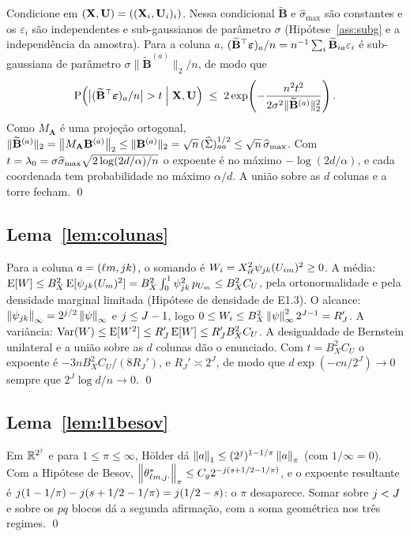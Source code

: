 \documentclass[11pt,a4paper]{article}
\newcommand{\Amat}{\mathbf{A}}
\newcommand{\Bmat}{\mathbf{B}}
\newcommand{\Btil}{\widetilde{\Bmat}}
\newcommand{\MA}{M_{\Amat}}
\newcommand{\bveps}{\boldsymbol{\varepsilon}}
\newcommand{\smax}{\widehat{\sigma}_{\max}}
\begin{document}
Condicione em $(\mathbf{X},\mathbf{U}) = ((\mathbf{X}_{i},\mathbf{U}_{i})_{i})$. Nessa condicional $\Btil$
e $\smax$ são constantes e os $\varepsilon_{i}$ são independentes e
sub-gaussianos de parâmetro $\sigma$ (Hipótese~\ref{ass:subg} e a
independência da amostra). Para a coluna $a$,
$(\Btil\T\bveps)_{a}/n = n^{-1}\sum_{i}\Btil_{ia}\varepsilon_{i}$ é
sub-gaussiana de parâmetro $\sigma\lVert\Btil^{(a)}\rVert_{2}/n$, de modo que
\[
  \Prob\Bigl(\bigl|(\Btil\T\bveps)_{a}/n\bigr| > t \;\Big|\; \bX,\bU\Bigr)
  \;\le\; 2\exp\!\left(-\frac{n^{2}t^{2}}{2\sigma^{2}\lVert\Btil^{(a)}\rVert_{2}^{2}}\right).
\]
Como $\MA$ é uma projeção ortogonal, $\lVert\Btil^{(a)}\rVert_{2} =
\norm{\MA\Bmat^{(a)}}_{2} \le \lVert\Bmat^{(a)}\rVert_{2} =
\sqrt{n}\,(\Gramhat)_{aa}^{1/2} \le \sqrt{n}\,\smax$. Com
$t = \pen_{0} = \sigma\smax\sqrt{2\log(2d/\alpha)/n}$ o expoente é no máximo
$-\log(2d/\alpha)$, e cada coordenada tem probabilidade no máximo $\alpha/d$.
A união sobre as $d$ colunas e a torre fecham. \qed

\subsection*{Lema~\ref{lem:colunas}}

Para a coluna $a = (\ell m,jk)$, o somando é
$W_{i} = X_{i\ell}^{2}\psi_{jk}(U_{im})^{2} \ge 0$. A média:
$\mathrm{E}[W] \le B_{X}^{2}\,\mathrm{E}[\psi_{jk}(U_{m})^{2}] =
B_{X}^{2}\int_{0}^{1}\psi_{jk}^{2}\,p_{U_{m}} \le B_{X}^{2}C_{U}$,
pela ortonormalidade e pela densidade marginal limitada (Hipótese de densidade
de E1.3). O alcance: $\left\lVert \psi_{jk} \right\rVert_{\infty} =
2^{j/2}\left\lVert \psi \right\rVert_{\infty}$ e $j \le J-1$, logo
$0 \le W_{i} \le B_{X}^{2}\left\lVert \psi \right\rVert_{\infty}^{2}2^{J-1} = R_{J}'$. A
variância: $\operatorname{Var}(W) \le \mathrm{E}[W^{2}] \le R_{J}'\,\mathrm{E}[W] \le
R_{J}'B_{X}^{2}C_{U}$. A desigualdade de Bernstein unilateral e a união sobre
as $d$ colunas dão o enunciado. Com $t = B_{X}^{2}C_{U}$ o expoente é
$-3nB_{X}^{2}C_{U}/(8R_{J}')$, e $R_{J}' \asymp 2^{J}$, de modo que
$d\exp(-cn/2^{J}) \to 0$ sempre que $2^{J}\log d/n \to 0$. \qed

\subsection*{Lema~\ref{lem:l1besov}}

Em $\mathbb{R}^{2^{j}}$ e para $1 \le \pi \le \infty$, Hölder dá
$\left\lVert a \right\rVert_{1} \le (2^{j})^{1-1/\pi}\left\lVert a \right\rVert_{\pi}$ (com $1/\infty = 0$).
Com a Hipótese de Besov, $\left\lVert \theta^{*}_{\ell m,j\cdot} \right\rVert_{\pi} \le
C_{g}2^{-j(s+1/2-1/\pi)}$, e o expoente resultante é
$j(1-1/\pi) - j(s+1/2-1/\pi) = j(1/2-s)$: o $\pi$ desaparece. Somar
sobre $j < J$ e sobre os $pq$ blocos dá a segunda afirmação, com a soma
geométrica nos três regimes. \qed
\end{document}

